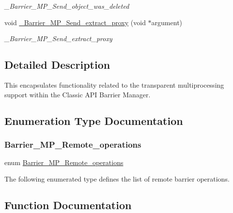 \begin{DoxyCompactItemize}
\begin{DoxyCompactList}\small\item\em \+\_\+\+Barrier\+\_\+\+M\+P\+\_\+\+Send\+\_\+object\+\_\+was\+\_\+deleted \end{DoxyCompactList}\item 
void \mbox{\hyperlink{group__ClassicBarrierMP_gacdbb9342c4bf1026fc73c55ae3bd14f0}{\+\_\+\+Barrier\+\_\+\+M\+P\+\_\+\+Send\+\_\+extract\+\_\+proxy}} (void $\ast$argument)
\begin{DoxyCompactList}\small\item\em \+\_\+\+Barrier\+\_\+\+M\+P\+\_\+\+Send\+\_\+extract\+\_\+proxy \end{DoxyCompactList}\end{DoxyCompactItemize}


\subsection{Detailed Description}
This encapsulates functionality related to the transparent multiprocessing support within the Classic A\+PI Barrier Manager. 

\subsection{Enumeration Type Documentation}
\mbox{\label{group__ClassicBarrierMP_ga14a42806fd76d110a17d806124a892d0}} 
\subsubsection{\texorpdfstring{Barrier\_MP\_Remote\_operations}{Barrier\_MP\_Remote\_operations}}
{\footnotesize\ttfamily enum \mbox{\hyperlink{group__ClassicBarrierMP_ga14a42806fd76d110a17d806124a892d0}{Barrier\+\_\+\+M\+P\+\_\+\+Remote\+\_\+operations}}}

The following enumerated type defines the list of remote barrier operations. 

\subsection{Function Documentation}
\mbox{\label{group__ClassicBarrierMP_ga835461ad93f2a18c9ea8c4db10071290}} 
